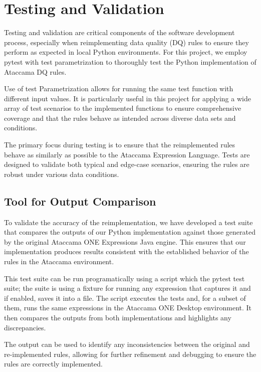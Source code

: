 \section{Testing and Validation}

Testing and validation are critical components of the software development process, especially when reimplementing data quality (DQ) rules to ensure they perform as expected in local Python environments. For this project, we employ pytest with test parametrization to thoroughly test the Python implementation of Ataccama DQ rules.


Use of test Parametrization allows for running the same test function with different input values. It is particularly useful in this project for applying a wide array of test scenarios to the implemented functions to ensure comprehensive coverage and that the rules behave as intended across diverse data sets and conditions.

The primary focus during testing is to ensure that the reimplemented rules behave as similarly as possible to the Ataccama Expression Language. Tests are designed to validate both typical and edge-case scenarios, ensuring the rules are robust under various data conditions.

\subsection{Tool for Output Comparison}

To validate the accuracy of the reimplementation, we have developed a test suite that compares the outputs of our Python implementation against those generated by the original Ataccama ONE Expressions Java engine. This ensures that our implementation produces results consistent with the established behavior of the rules in the Ataccama environment.

This test suite can be run programatically using a script which the pytest test suite; the suite is using a fixture for running any expression that captures it and if enabled, saves it into a file. The script executes the tests and, for a subset of them, runs the same expressions in the Ataccama ONE Desktop environment. It then compares the outputs from both implementations and highlights any discrepancies.

The output can be used to identify any inconsistencies between the original and re-implemented rules, allowing for further refinement and debugging to ensure the rules are correctly implemented.

